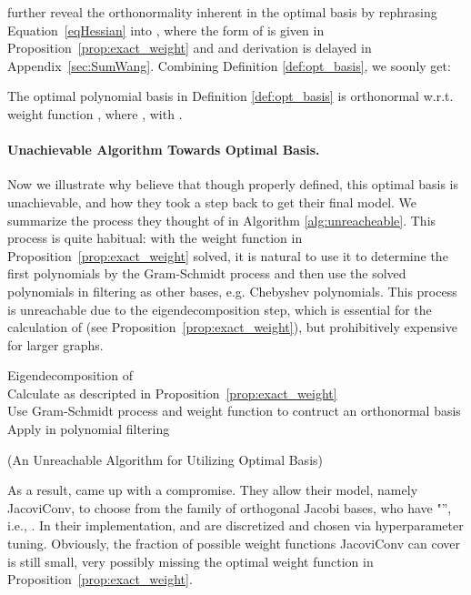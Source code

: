 \citet{Wang2022jacobi} further reveal the orthonormality inherent in the optimal basis by rephrasing Equation~\eqref{eqHessian} into  
,
where the form of  is given in Proposition~\ref{prop:exact_weight} and 
and derivation is delayed in Appendix~\ref{sec:SumWang}.
Combining Definition \ref{def:opt_basis},
we soonly get:

\begin{tcolorbox}[boxrule=0.pt,height=19mm,valign=center,colback=blue!3!white]
\begin{proposition}
    The optimal polynomial basis in Definition \ref{def:opt_basis} is orthonormal w.r.t. weight function , 
        where 
        , 
        with
        .
        \label{prop:exact_weight}
\end{proposition}
\end{tcolorbox}


\paragraph{Unachievable Algorithm Towards Optimal Basis.}
Now we illustrate why \citet{Wang2022jacobi} believe that
though properly defined, this optimal basis is unachievable,     
and how they took a step back to get their final model. 
We summarize the process they thought of in Algorithm \ref{alg:unreacheable}. 
This process is quite habitual:  
with the weight function in Proposition~\ref{prop:exact_weight} solved,  
it is natural to use it to determine the first  polynomials by the Gram-Schmidt process 
and then use the solved polynomials in filtering as other bases, e.g. Chebyshev polynomials. 
This process is unreachable due to the eigendecomposition step, 
which is essential for the calculation of  (see Proposition~\ref{prop:exact_weight}), 
but prohibitively expensive for larger graphs. 


\begin{algorithm}[tb]
    \SetAlgoLined
{} 
    \BlankLine
    \Indp 
    {} Eigendecomposition of {}
    \\
    Calculate  as descripted in
Proposition~\ref{prop:exact_weight}
    \\
    Use Gram-Schmidt process and weight function  to contruct an orthonormal basis 
    \\
    Apply  in polynomial filtering
    \caption{(An Unreachable Algorithm for Utilizing Optimal Basis)}
    \label{alg:unreacheable}
\end{algorithm} 
As a result, 
\citet{Wang2022jacobi} came up with a compromise. They allow their
model, namely JacoviConv, to choose from the family of orthogonal Jacobi bases, 
who have "{}'', 
i.e., . 
In their implementation,   and  are discretized and chosen via hyperparameter tuning. 
Obviously, the fraction of possible weight functions JacoviConv can cover is still small, 
very possibly missing the optimal weight function in Proposition~\ref{prop:exact_weight}.  



